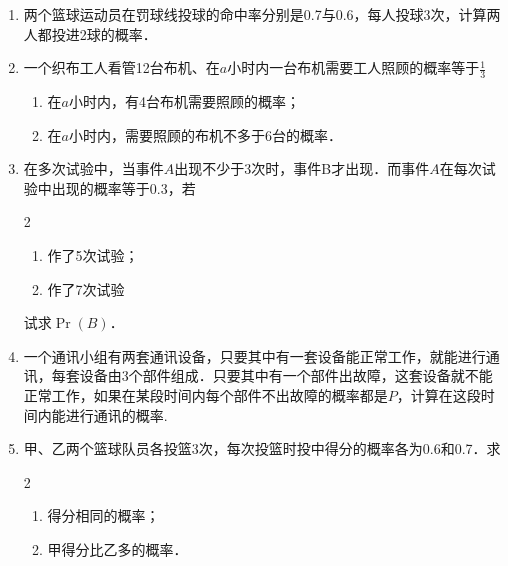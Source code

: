 \begin{enumerate}
\item 两个篮球运动员在罚球线投球的命中率分别是0.7与0.6，每人投球3次，计算两人都投进2球的概率．
\item 一个织布工人看管12台布机、在$a$小时内一台布机需要工人照顾的概率等于$\frac{1}{3}$
\begin{enumerate}[(1)]
\item 在$a$小时内，有4台布机需要照顾的概率；
\item 在$a$小时内，需要照顾的布机不多于6台的概率．
\end{enumerate}

\item 在多次试验中，当事件$A$出现不少于3次时，事件B才出现．而事件$A$在每次试验中出现的概率等于0.3，若
\begin{multicols}{2}
    \begin{enumerate}[(1)]
    \item 作了5次试验；
    \item 作了7次试验
\end{enumerate}
\end{multicols}
试求$\Pr(B)$．

\item 一个通讯小组有两套通讯设备，只要其中有一套设备能正常工作，就能进行通讯，每套设备由3个部件组成．只要其中有一个部件出故障，这套设备就不能正常工作，如果在某段时间内每个部件不出故障的概率都是$P$，计算在这段时间内能进行通讯的概率.
\item 甲、乙两个篮球队员各投篮3次，每次投篮时投中得分的概率各为0.6和0.7．求
\begin{multicols}{2}
\begin{enumerate}[(1)]
    \item 得分相同的概率；
    \item 甲得分比乙多的概率．
\end{enumerate}    
\end{multicols}

\end{enumerate}

